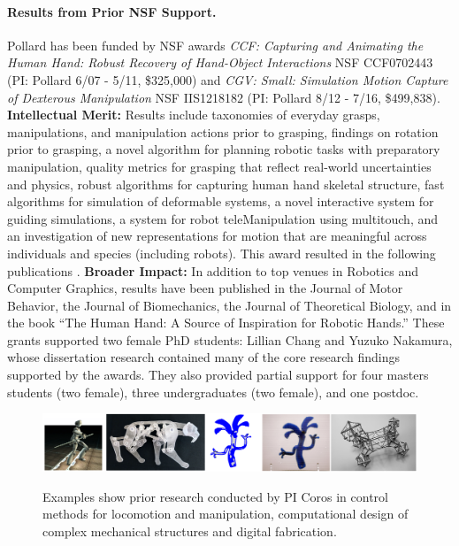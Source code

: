 \paragraph{Results from Prior NSF Support.}
Pollard has been funded by NSF awards \emph{CCF: Capturing and Animating the Human Hand: Robust Recovery of Hand-Object Interactions} NSF CCF0702443 (PI:  Pollard  6/07 - 5/11, \$325,000)  and \emph{CGV: Small: Simulation Motion Capture of Dexterous Manipulation} NSF IIS1218182 (PI:  Pollard  8/12 - 7/16, \$499,838).
{\bf Intellectual Merit:}  Results include taxonomies of everyday grasps, manipulations, and manipulation actions prior to grasping, findings on rotation prior to grasping, a novel algorithm for planning robotic tasks with preparatory manipulation, quality metrics for grasping that reflect real-world uncertainties and physics, robust
algorithms for capturing human hand skeletal structure, fast algorithms for simulation of deformable systems, a novel interactive system for guiding
simulations, a system for robot teleManipulation using multitouch, and an investigation of new
representations for motion that are meaningful across 
individuals and species (including robots).  This award resulted in the following
publications
\cite{liu2016annotating,chung2015quadratic,Liu2014,illing2014changing,kim2013physically,Toh:2012,Chang:2014,Gatesy:2011,Kappler:2012,Kim:ToG11,Kim:CGA11,Koonjul:ICRA11,Chang:JMB10,Chang:ICRA10,Kappler:Humanoids10,Chang:2009,Chang:twoAxis08,Chang:Humanoids08}.
{\bf Broader Impact:}  In addition to top venues in Robotics and Computer Graphics, results
have been published in the Journal of Motor Behavior, the Journal of
Biomechanics, the Journal of Theoretical Biology, and
in the book ``The Human Hand: A Source of Inspiration for
Robotic Hands.''  These grants supported two female PhD students: Lillian Chang and Yuzuko Nakamura,
whose dissertation research contained many of the core research findings
supported by the awards.  They also provided partial support for four masters students (two female), three undergraduates (two female),
and one postdoc.

\begin{figure}
\begin{center}
{\includegraphics[width=\linewidth]{./figs/corosPrior}}
\end{center}
\caption{Examples show prior research conducted by PI Coros in control methods for locomotion and manipulation, computational design of complex mechanical structures and digital fabrication.}
\label{fig:corosPrior}
\end{figure}

